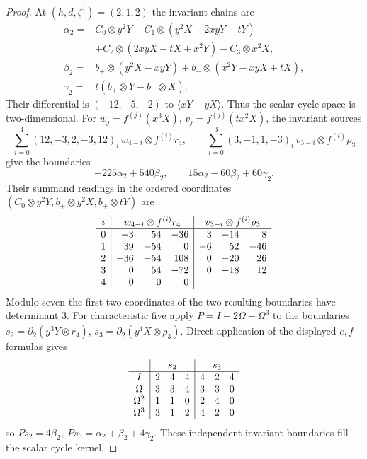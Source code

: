 \documentclass[11pt]{article}
\theoremstyle{plain}
\theoremstyle{definition}
\theoremstyle{remark}
\numberwithin{equation}{section}
\begin{document}
\begin{proof}
At \((h,d,\zeta^\dagger)=(2,1,2)\) the invariant chains are
\begin{align*}
 \alpha_2={}&C_0\otimes y^2Y-C_1\otimes(y^2X+2xyY-tY)\\
            &+C_2\otimes(2xyX-tX+x^2Y)-C_3\otimes x^2X,\\
 \beta_2={}&b_+\otimes(y^2X-xyY)+b_-\otimes(x^2Y-xyX+tX),\\
 \gamma_2={}&t(b_+\otimes Y-b_-\otimes X).
\end{align*}
Their differential is \((-12,-5,-2)\) to \(\langle xY-yX\rangle\).
Thus the scalar cycle space is two-dimensional.
For \(w_j=f^{(j)}(x^3X)\), \(v_j=f^{(j)}(tx^2X)\), the invariant sources
\[
 \sum_{i=0}^4(12,-3,2,-3,12)_i\,w_{4-i}\otimes f^{(i)}r_4,\qquad
 \sum_{i=0}^3(3,-1,1,-3)_i\,v_{3-i}\otimes f^{(i)}\rho_3
\]
give the boundaries
\[
 -225\alpha_2+540\beta_2,\qquad
 15\alpha_2-60\beta_2+60\gamma_2 .
\]
Their summand readings in the ordered coordinates
\((C_0\otimes y^2Y,b_+\otimes y^2X,b_+\otimes tY)\) are
\[
\begin{array}{c|rrr|rrr}
 i&\multicolumn{3}{c|}{w_{4-i}\otimes f^{(i)}r_4}&
     \multicolumn{3}{c}{v_{3-i}\otimes f^{(i)}\rho_3}\\\hline
 0&-3&54&-36&3&-14&8\\
 1&39&-54&0&-6&52&-46\\
 2&-36&-54&108&0&-20&26\\
 3&0&54&-72&0&-18&12\\
 4&0&0&0&&&
\end{array}
\]
Modulo seven the first two coordinates of the two resulting boundaries
have determinant \(3\).
For characteristic five apply \(P=I+2\Omega-\Omega^3\) to the boundaries
\(s_2=\partial_2(y^3Y\otimes r_4)\),
\(s_3=\overline{\partial_2(y^4X\otimes\rho_3)}\).
Direct application of the displayed \(e,f\) formulas gives
\[
\begin{array}{c|rrr|rrr}
 &\multicolumn{3}{c|}{s_2}&\multicolumn{3}{c}{s_3}\\\hline
 I&2&4&4&4&2&4\\
 \Omega&3&3&4&3&3&0\\
 \Omega^2&1&1&0&2&4&0\\
 \Omega^3&3&1&2&4&2&0
\end{array}
\]
so \(Ps_2=4\beta_2,\ Ps_3=\alpha_2+\beta_2+4\gamma_2\).
These independent invariant boundaries fill the scalar cycle kernel.


\end{proof}
\end{document}
